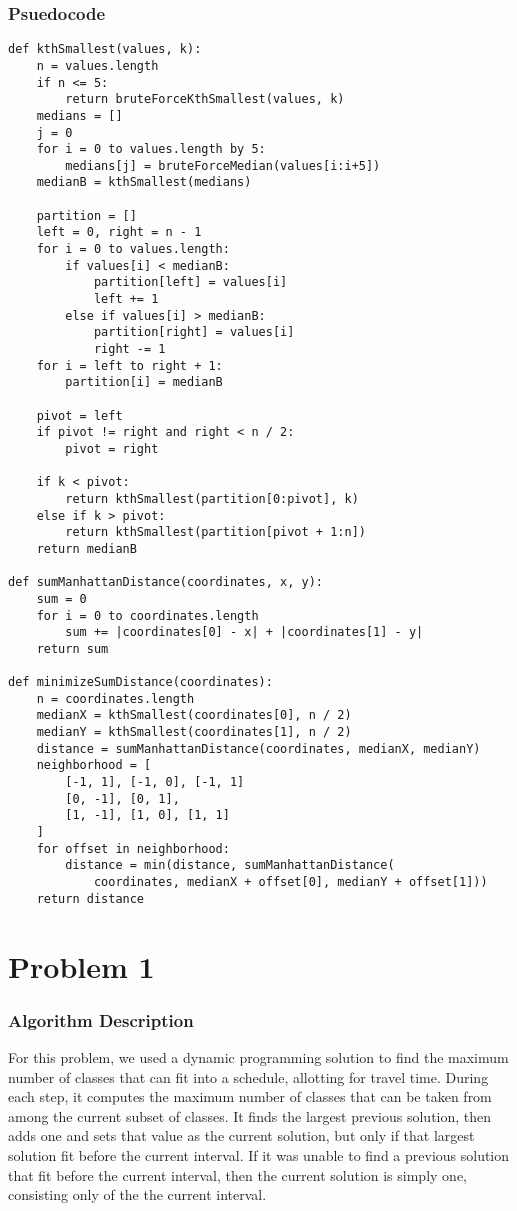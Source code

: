 \documentclass[letterpaper, 12pt]{math}
\begin{document}
\subsubsection*{Psuedocode}
\begin{lstlisting}
def kthSmallest(values, k):
    n = values.length
    if n <= 5:
        return bruteForceKthSmallest(values, k)
    medians = []
    j = 0
    for i = 0 to values.length by 5:
        medians[j] = bruteForceMedian(values[i:i+5])
    medianB = kthSmallest(medians)

    partition = []
    left = 0, right = n - 1
    for i = 0 to values.length:
        if values[i] < medianB:
            partition[left] = values[i]
            left += 1
        else if values[i] > medianB:
            partition[right] = values[i]
            right -= 1
    for i = left to right + 1:
        partition[i] = medianB

    pivot = left
    if pivot != right and right < n / 2:
        pivot = right

    if k < pivot:
        return kthSmallest(partition[0:pivot], k)
    else if k > pivot:
        return kthSmallest(partition[pivot + 1:n])
    return medianB

def sumManhattanDistance(coordinates, x, y):
    sum = 0
    for i = 0 to coordinates.length
        sum += |coordinates[0] - x| + |coordinates[1] - y|
    return sum

def minimizeSumDistance(coordinates):
    n = coordinates.length
    medianX = kthSmallest(coordinates[0], n / 2)
    medianY = kthSmallest(coordinates[1], n / 2)
    distance = sumManhattanDistance(coordinates, medianX, medianY)
    neighborhood = [
        [-1, 1], [-1, 0], [-1, 1]
        [0, -1], [0, 1],
        [1, -1], [1, 0], [1, 1]
    ]
    for offset in neighborhood:
        distance = min(distance, sumManhattanDistance(
            coordinates, medianX + offset[0], medianY + offset[1]))
    return distance
\end{lstlisting}

\section*{Problem 1}

\subsubsection*{Algorithm Description}
For this problem, we used a dynamic programming solution to find the maximum
number of classes that can fit into a schedule, allotting for travel time.
During each step, it computes the maximum number of classes that can be taken
from among the current subset of classes. It finds the largest previous
solution, then adds one and sets that value as the current solution, but only
if that largest solution fit before the current interval. If it was unable to
find a previous solution that fit before the current interval, then the current
solution is simply one, consisting only of the the current interval.
\end{document}
